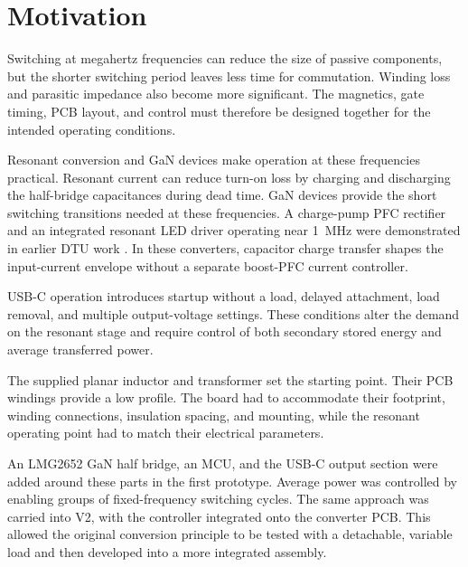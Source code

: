 \section{Motivation}
\label{sec:intro-motivation}

Switching at megahertz frequencies can reduce the size of passive components, but the shorter switching period leaves less time for commutation. Winding loss and parasitic impedance also become more significant. The magnetics, gate timing, PCB layout, and control must therefore be designed together for the intended operating conditions.

Resonant conversion and GaN devices make operation at these frequencies practical. Resonant current can reduce turn-on loss by charging and discharging the half-bridge capacitances during dead time. GaN devices provide the short switching transitions needed at these frequencies. A charge-pump PFC rectifier and an integrated resonant LED driver operating near \SI{1}{\mega\hertz} were demonstrated in earlier DTU work \cite{ammar2020chargepump,ammar2021led}. In these converters, capacitor charge transfer shapes the input-current envelope without a separate boost-PFC current controller.

USB-C operation introduces startup without a load, delayed attachment, load removal, and multiple output-voltage settings. These conditions alter the demand on the resonant stage and require control of both secondary stored energy and average transferred power.

The supplied planar inductor and transformer set the starting point. Their PCB windings provide a low profile. The board had to accommodate their footprint, winding connections, insulation spacing, and mounting, while the resonant operating point had to match their electrical parameters.

An LMG2652 GaN half bridge, an MCU, and the USB-C output section were added around these parts in the first prototype. Average power was controlled by enabling groups of fixed-frequency switching cycles. The same approach was carried into V2, with the controller integrated onto the converter PCB. This allowed the original conversion principle to be tested with a detachable, variable load and then developed into a more integrated assembly.